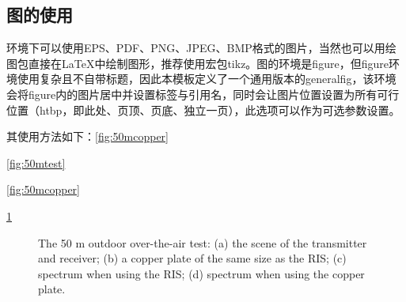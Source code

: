 \documentclass[supercite]{HustGraduPaper}
\begin{document}
\subsection{图的使用}
\XeLaTeX 环境下可以使用EPS、PDF、PNG、JPEG、BMP格式的图片，当然也可以用绘图包直接在\LaTeX 中绘制图形，推荐使用宏包tikz。图的环境是figure，但figure环境使用复杂且不自带标题，因此本模板定义了一个通用版本的generalfig，该环境会将figure内的图片居中并设置标签与引用名，同时会让图片位置设置为所有可行位置（htbp，即此处、页顶、页底、独立一页），此选项可以作为可选参数设置。

其使用方法如下：\autoref{fig:50mcopper}


\autoref{fig:50mtest}

\ref{fig:50mcopper}

\ref{fig:50mtest}

\begin{figure}[t!]
	\centering
	\hfil
	\hfil
	\hfil
	\caption{The 50 m outdoor over-the-air test: (a) the scene of the transmitter and receiver; (b) a copper plate of the same size as the RIS; (c) spectrum when using the RIS; (d) spectrum when using the copper plate.}
	\label{fig:50mtest}
\end{figure}
\end{document}

